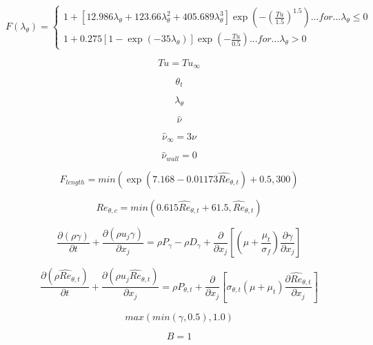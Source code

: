\begin{equation}
F\left(\lambda_\theta \right) = \left\{ \begin{array}{l}
1 + \left[12.986 \lambda_\theta + 123.66 \lambda_\theta^2 + 405.689 \lambda_\theta^3 \right] \exp\left( - \left( \frac{Tu}{1.5}  \right)^{1.5}\right) ...{for}... \lambda_\theta \leq 0\\
1+ 0.275\left[1-\exp\left( -35 \lambda_\theta \right)\right] \exp\left( -\frac{Tu}{0.5}  \right) ...{for}...  \lambda_\theta >0
\end{array}
\end{equation}

\begin{equation}
Tu = Tu_\infty
\end{equation}

\begin{equation}
\theta_t
\end{equation}

\begin{equation}
\lambda_{\theta}
\end{equation}

\begin{equation}
\widehat \nu
\end{equation}

\begin{equation}
\widehat \nu_\infty=3\nu
\end{equation}

\begin{equation}
\widehat \nu_{wall}=0
\end{equation}

\begin{equation}
F_{length} = min \left( \exp\left( 7.168-0.01173\widehat{Re}_{\theta,t} \right) + 0.5 , 300\right)
\end{equation}

\begin{equation}
Re_{\theta,c} = min \left( 0.615 \widehat{Re}_{\theta,t} + 61.5 , \widehat{Re}_{\theta,t} \right)
\end{equation}

\begin{equation}
\frac{\partial (\rho\gamma)}{\partial t} + \frac{\partial (\rho u_j \gamma)}{\partial x_j} = \rho P_\gamma  - \rho D_\gamma  + 
 \frac{\partial}{\partial x_j}\left[
 \left( \mu + \frac{\mu_t}{\sigma_f}\right) \frac{\partial \gamma}{\partial x_j} \right]
\end{equation}

\begin{equation}
\frac{\partial (\rho \widehat{Re}_{\theta,t})}{\partial t} + \frac{\partial (\rho u_j \widehat{Re}_{\theta,t}) }{\partial x_j} = 
 \rho P_{\theta,t}  + \frac{\partial}{\partial x_j} \left[
 \sigma_{\theta,t} \left( \mu + \mu_t \right) \frac{\partial \widehat{Re}_{\theta,t}}{\partial x_j} \right]
\end{equation}

\begin{equation}
max \left( min\left(\gamma, 0.5\right) ,1.0 \right)
\end{equation}

\begin{equation}
B=1
\end{equation}


